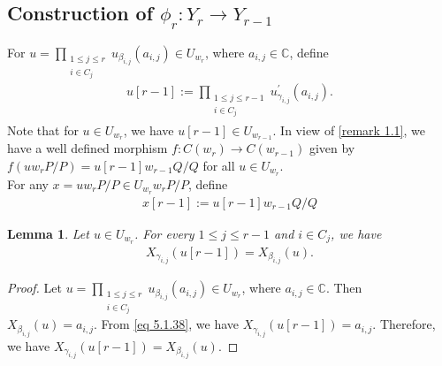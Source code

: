 \documentclass[12pt,reqno]{amsart}
\numberwithin{equation}{section}
\newtheorem{lemma}[theorem]{Lemma}
\theoremstyle{definition}
\begin{document}
\subsection{Construction of $\phi_{r}:Y_{r}\longrightarrow Y_{r-1}$}\label{section 5.1} For $u=\displaystyle\prod_{\substack{1\leq j\leq r\\i\in C_{j}}}u_{\beta_{i,j}}(a_{i,j})\in U_{w_{r}}$, where $a_{i,j}\in\mathbb{C}$, define \begin{align}\label{eq 5.1.38}
	u[r-1]:=\prod_{\substack{1\leq j\leq r-1\\i\in C_{j}}}u^{\prime}_{\gamma_{i,j}}(a_{i,j}).
\end{align}
Note that for $u\in U_{w_{r}}$, we have $u[r-1]\in U_{w_{r-1}}$.
In view of \cref{remark 1.1}, we have a well defined morphism $f:C(w_{r})\longrightarrow C(w_{r-1})$ given by $f(uw_{r}P/P)=u[r-1]w_{r-1}Q/Q$ for all $u\in U_{w_{r}}$.\\
For any $x=uw_{r}P/P\in U_{w_{r}}w_{r}P/P$, define \begin{align}\label{eq 5.1.18}
	x[r-1]:=u[r-1]w_{r-1}Q/Q
\end{align}
  \begin{lemma}\label{eq 5.1.11} Let $u\in U_{w_{r}}$. For every $1\leq j\leq r-1$ and $i\in C_{j}$, we have
	\begin{align*}
		X_{\gamma_{i,j}}(u[r-1])=X_{\beta_{i,j}}(u).
	\end{align*}
\end{lemma}
\begin{proof}
 Let $u=\prod_{\substack{1\leq j\leq r\\i\in C_{j}}}u_{\beta_{i,j}}(a_{i,j})\in U_{w_{r}}$, where $a_{i,j}\in\mathbb{C}$. Then $X_{\beta_{i,j}}(u)=a_{i,j}$. From \cref{eq 5.1.38}, we have $X_{\gamma_{i,j}}(u[r-1])=a_{i,j}$. Therefore, we have $X_{\gamma_{i,j}}(u[r-1])=X_{\beta_{i,j}}(u)$.
\end{proof}
\end{document}
